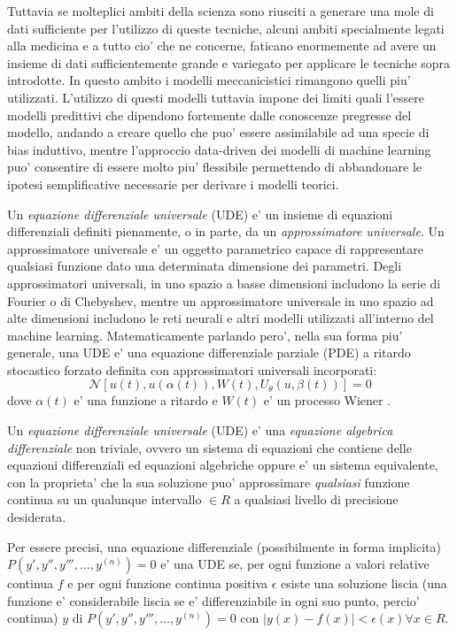 Tuttavia se molteplici ambiti della scienza sono riusciti a generare una mole di dati sufficiente per l'utilizzo di 
queste tecniche, alcuni ambiti specialmente legati alla medicina e a tutto cio' che ne concerne, faticano enormemente
ad avere un insieme di dati sufficientemente grande e variegato per applicare le tecniche sopra introdotte. In questo 
ambito i modelli meccanicistici rimangono quelli piu' utilizzati. L'utilizzo di questi modelli tuttavia impone dei limiti 
quali l'essere modelli predittivi che dipendono fortemente dalle conoscenze pregresse del modello, andando a creare quello 
che puo' essere assimilabile ad una specie di bias induttivo, mentre l'approccio data-driven dei modelli di machine learning 
puo' consentire di essere molto piu' flessibile permettendo di abbandonare le ipotesi semplificative 
necessarie per derivare i modelli teorici. 

Un \emph{equazione differenziale universale} (UDE) e' un insieme di equazioni differenziali definiti pienamente,
o in parte, da un \emph{approssimatore universale}. Un approssimatore universale e' un oggetto parametrico 
capace di rappresentare qualsiasi funzione dato una determinata dimensione dei parametri. Degli approssimatori 
universali, in uno spazio a basse dimensioni includono la serie di Fourier o di Chebyshev, mentre un 
approssimatore universale in uno spazio ad alte dimensioni includono le reti neurali e altri modelli utilizzati 
all'interno del machine learning. Matematicamente parlando pero', nella sua forma piu' generale, una UDE e' 
una equazione differenziale parziale (PDE) a ritardo stocastico forzato definita con approssimatori universali incorporati:
$$\mathcal{N}[u(t), u(\alpha(t)), W(t), U_\theta(u, \beta(t))] = 0$$
dove $\alpha(t)$ e' una funzione a ritardo e $W(t)$ e' un processo Wiener \cite{wiki:Processo_di_Wiener}.

Un \emph{equazione differenziale universale} (UDE) e' una \emph{equazione algebrica
differenziale}\cite{wiki:Differential-algebraic_system_of_equations} 
non triviale, ovvero un sistema di equazioni che contiene delle equazioni differenziali
ed equazioni algebriche oppure e' un sistema equivalente,
con la proprieta' che la sua soluzione puo' approssimare
\emph{qualsiasi} funzione continua su un qualunque intervallo $\in R$ a 
qualsiasi livello di precisione desiderata. \cite{wiki:Universal_differential_equation}

Per essere precisi, una equazione differenziale (possibilmente in forma implicita)
$P( y', y'', y''', ..., y^{(n)})=0$ e' una UDE se, per ogni funzione a valori relative
continua $f$ e per ogni funzione continua positiva $\epsilon$ esiste una 
soluzione liscia\cite{wiki:Smoothness} (una funzione e' considerabile liscia se e' 
differenziabile in ogni suo punto, percio' continua) $y$ di $P( y', y'', y''', ..., y^{(n)})=0$
con $|y(x) - f(x)| < \epsilon(x) \forall x \in R$.

